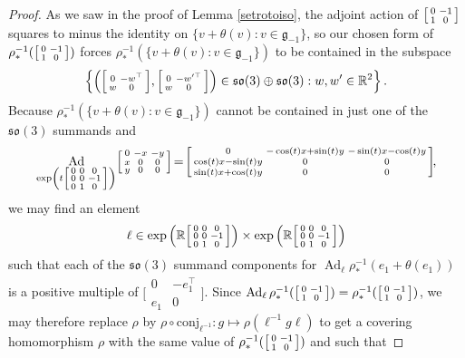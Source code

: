 \documentclass[12pt,a4paper]{amsart}
\theoremstyle{definition}
\DeclareMathOperator{\Ad}{Ad}
\newenvironment{smallbmatrix}
  {\left[\begin{smallmatrix}}
  {\end{smallmatrix}\right]}
\newcommand{\rotoiso}{\begin{smallbmatrix}0 & -1 \\ 1 & 0\end{smallbmatrix}}
\begin{document}
\begin{proof}As we saw in the proof of Lemma \ref{setrotoiso}, the adjoint action of $\rotoiso$ squares to minus the identity on $\{v+\theta(v):v\in\mathfrak{g}_{-1}\}$, so our chosen form of $\rho_*^{-1}(\rotoiso)$ forces $\rho_*^{-1}(\{v+\theta(v):v\in\mathfrak{g}_{-1}\})$ to be contained in the subspace
\[\left\{\left(\begin{smallbmatrix}0 & -w^\top \\ w & 0\end{smallbmatrix},\begin{smallbmatrix}0 & -w'^\top \\ w & 0\end{smallbmatrix}\right)\in\mathfrak{so}(3)\oplus\mathfrak{so}(3):w,w'\in\mathbb{R}^2\right\}.\]
Because $\rho_*^{-1}(\{v+\theta(v):v\in\mathfrak{g}_{-1}\})$ cannot be contained in just one of the $\mathfrak{so}(3)$ summands and
\[\Ad_{\exp\left(t\begin{smallbmatrix}0 & 0 & 0 \\ 0 & 0 & -1 \\ 0 & 1 & 0\end{smallbmatrix}\right)}\!\begin{smallbmatrix}0 & -x & -y \\ x & 0 & 0 \\ y & 0 & 0\end{smallbmatrix}\!=\!\begin{smallbmatrix}0 & -\cos(t)x+\sin(t)y & -\sin(t)x-\cos(t)y \\ \cos(t)x-\sin(t)y & 0 & 0 \\ \sin(t)x+\cos(t)y & 0 & 0\end{smallbmatrix}\!,\]
we may find an element
\[\ell\in\exp\left(\mathbb{R}\begin{smallbmatrix}0 & 0 & 0 \\ 0 & 0 & -1 \\ 0 & 1 & 0\end{smallbmatrix}\right)\times\exp\left(\mathbb{R}\begin{smallbmatrix}0 & 0 & 0 \\ 0 & 0 & -1 \\ 0 & 1 & 0\end{smallbmatrix}\right)\]
such that each of the $\mathfrak{so}(3)$ summand components for $\Ad_\ell\rho_*^{-1}(e_1+\theta(e_1))$ is a positive multiple of $\big[\begin{smallmatrix}0 & -e_1^\top\\ e_1 & 0\end{smallmatrix}\big]$. Since $\Ad_\ell\rho_*^{-1}(\rotoiso)=\rho_*^{-1}(\rotoiso)$, we may therefore replace $\rho$ by $\rho\circ\mathrm{conj}_{\ell^{-1}}\!:g\mapsto\rho(\ell^{-1} g\ell)$ to get a covering homomorphism $\rho$ with the same value of $\rho_*^{-1}(\rotoiso)$ and such that

\end{proof}
\end{document}
